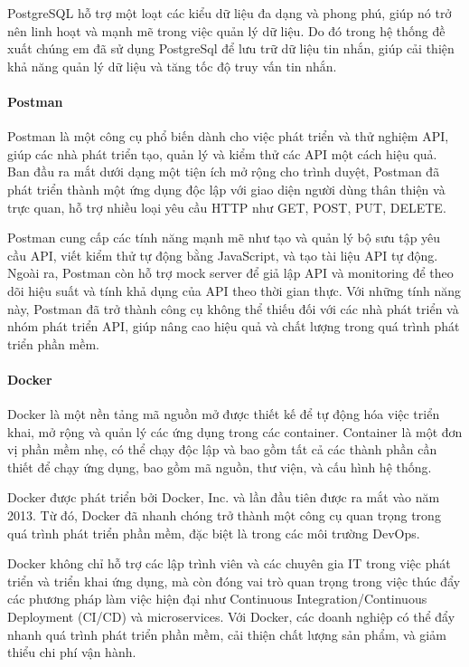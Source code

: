 PostgreSQL hỗ trợ một loạt các kiểu dữ liệu đa dạng và phong phú, giúp nó trở nên linh hoạt và mạnh mẽ trong việc quản lý dữ liệu. Do đó trong hệ thống đề xuất chúng em đã sử dụng PostgreSql để lưu trữ dữ liệu tin nhắn, giúp cải thiện khả năng quản lý dữ liệu và tăng tốc độ truy vấn tin nhắn.

\paragraph{Postman}
\mbox{}

Postman là một công cụ phổ biến dành cho việc phát triển và thử nghiệm API, giúp các nhà phát triển tạo, quản lý và kiểm thử các API một cách hiệu quả. Ban đầu ra mắt dưới dạng một tiện ích mở rộng cho trình duyệt, Postman đã phát triển thành một ứng dụng độc lập với giao diện người dùng thân thiện và trực quan, hỗ trợ nhiều loại yêu cầu HTTP như GET, POST, PUT, DELETE.

Postman cung cấp các tính năng mạnh mẽ như tạo và quản lý bộ sưu tập yêu cầu API, viết kiểm thử tự động bằng JavaScript, và tạo tài liệu API tự động. Ngoài ra, Postman còn hỗ trợ mock server để giả lập API và monitoring để theo dõi hiệu suất và tính khả dụng của API theo thời gian thực. Với những tính năng này, Postman đã trở thành công cụ không thể thiếu đối với các nhà phát triển và nhóm phát triển API, giúp nâng cao hiệu quả và chất lượng trong quá trình phát triển phần mềm.
\paragraph{Docker}
\mbox{}

Docker là một nền tảng mã nguồn mở được thiết kế để tự động hóa việc triển khai, mở rộng và quản lý các ứng dụng trong các container. Container là một đơn vị phần mềm nhẹ, có thể chạy độc lập và bao gồm tất cả các thành phần cần thiết để chạy ứng dụng, bao gồm mã nguồn, thư viện, và cấu hình hệ thống.

Docker được phát triển bởi Docker, Inc. và lần đầu tiên được ra mắt vào năm 2013. Từ đó, Docker đã nhanh chóng trở thành một công cụ quan trọng trong quá trình phát triển phần mềm, đặc biệt là trong các môi trường DevOps.

Docker không chỉ hỗ trợ các lập trình viên và các chuyên gia IT trong việc phát triển và triển khai ứng dụng, mà còn đóng vai trò quan trọng trong việc thúc đẩy các phương pháp làm việc hiện đại như Continuous Integration/Continuous Deployment (CI/CD) và microservices. Với Docker, các doanh nghiệp có thể đẩy nhanh quá trình phát triển phần mềm, cải thiện chất lượng sản phẩm, và giảm thiểu chi phí vận hành.


